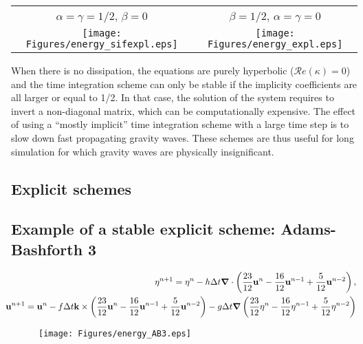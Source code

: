 \begin{center}
	\begin{tabular}{cc}
		$\alpha = \gamma = 1/2$, $\beta=0$  & $\beta = 1/2$, $\alpha = \gamma = 0$ \\
		\texttt{[image: Figures/energy\_sifexpl.eps]}
		&
		\texttt{[image: Figures/energy\_expl.eps]}
	\end{tabular}
\end{center}

\BTi
When there is no dissipation, the equations are purely hyperbolic ($\mathcal{R}e(\kappa) = 0$) and the time integration scheme can only be stable if the implicity coefficients are all larger or equal to 1/2. In that case, the solution of the system requires to invert a non-diagonal matrix, which can be computationally expensive. The effect of using a ``mostly implicit'' time integration scheme with a large time step is to slow down fast propagating gravity waves. These schemes are thus useful for long simulation for which gravity waves are physically insignificant.
\ETi



\subsection{Explicit schemes}
\subsection{Example of a stable explicit scheme: Adams-Bashforth 3}

\begin{eqnarray*}
	&&\hspace{-0.6cm} \eta^{n+1} = \eta^n - h \Delta t \bnabla \cdot \left(\frac{23}{12} \bu^n - \frac{16}{12} \bu^{n-1} + \frac{5}{12} \bu^{n-2}\right),
	\\
	&&\hspace{-0.6cm} \bu^{n+1} = \bu^n - f \Delta t \bk \times \left(\frac{23}{12} \bu^n - \frac{16}{12} \bu^{n-1} + \frac{5}{12} \bu^{n-2}\right) - g \Delta t \bnabla \left( \frac{23}{12} \eta^n - \frac{16}{12} \eta^{n-1} + \frac{5}{12} \eta^{n-2} \right)
\end{eqnarray*}

	
	\begin{figure}
		\texttt{[image: Figures/energy\_AB3.eps]}
	\end{figure}
\hfill
	
